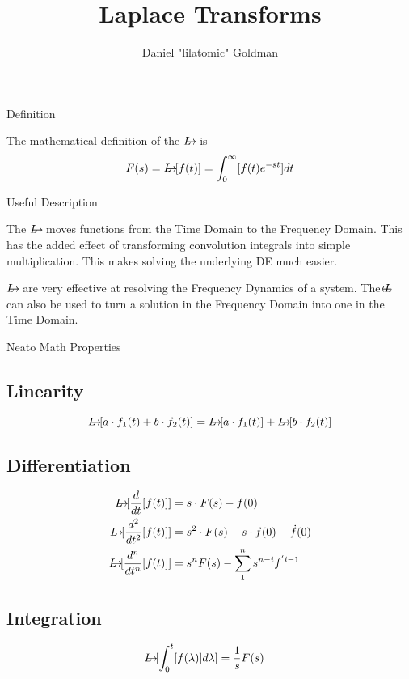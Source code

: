 \documentclass{../templates/mathtool}
\title{Laplace Transforms}
\author{Daniel "lilatomic" Goldman}
\begin{document}
\maketitle

\begin{section}{Definition}
	
	The mathematical definition of the $\laplace$ is
	\begin{equation}
		F(s) = \laplace[f(t)] = \int_0^\infty[f(t)e^{-st}]dt
	\end{equation}
	
\end{section}

\begin{section}{Useful Description}
	
	The $\laplace$ moves functions from the Time Domain to the Frequency Domain. This has the added effect of transforming convolution integrals into simple multiplication. This makes solving the underlying DE much easier.
	
	$\laplace$ are very effective at resolving the Frequency Dynamics of a system. The $\ilaplace$ can also be used to turn a solution in the Frequency Domain into one in the Time Domain.
	
\end{section}

\begin{section}{Neato Math Properties}
	\subsection{Linearity}
		\begin{equation*}
			\laplace[a \cdot f_1(t) + b \cdot f_2(t)] = \laplace[a \cdot f_1(t)] + \laplace[b \cdot f_2(t)]
		\end{equation*}
	
	\subsection{Differentiation}
		\begin{align*}
			\laplace[\frac{d}{dt}[f(t)]] &= s \cdot F(s)-f(0) \\
			\laplace[\frac{d^2}{dt^2}[f(t)]] &= s^2 \cdot F(s)- s \cdot f(0) -\dot{f}(0) \\
			\laplace[\frac{d^n}{dt^n}[f(t)]] &= s^n F(s) - \sum_1^n s^{n-i} f^{'i-1}
		\end{align*}
	
	\subsection{Integration}
		\begin{align*}
			\laplace[\int_{0}^{t}[f(\lambda)]d\lambda] &= \frac{1}{s}F(s)
		\end{align*}
\end{section}
\end{document}
